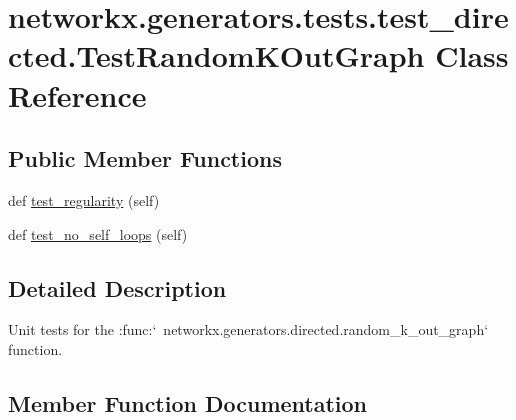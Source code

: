 \hypertarget{classnetworkx_1_1generators_1_1tests_1_1test__directed_1_1TestRandomKOutGraph}{}\section{networkx.\+generators.\+tests.\+test\+\_\+directed.\+Test\+Random\+K\+Out\+Graph Class Reference}
\label{classnetworkx_1_1generators_1_1tests_1_1test__directed_1_1TestRandomKOutGraph}
\subsection*{Public Member Functions}
\begin{DoxyCompactItemize}
\item 
def \hyperlink{classnetworkx_1_1generators_1_1tests_1_1test__directed_1_1TestRandomKOutGraph_a12923761e98287f44bddb8eaa96e5865}{test\+\_\+regularity} (self)
\item 
def \hyperlink{classnetworkx_1_1generators_1_1tests_1_1test__directed_1_1TestRandomKOutGraph_aba08fcf62a2de1d68e087d208eef004d}{test\+\_\+no\+\_\+self\+\_\+loops} (self)
\end{DoxyCompactItemize}


\subsection{Detailed Description}
\begin{DoxyVerb}Unit tests for the
:func:`~networkx.generators.directed.random_k_out_graph` function.\end{DoxyVerb}
 

\subsection{Member Function Documentation}
\mbox{\label{classnetworkx_1_1generators_1_1tests_1_1test__directed_1_1TestRandomKOutGraph_aba08fcf62a2de1d68e087d208eef004d}} 
